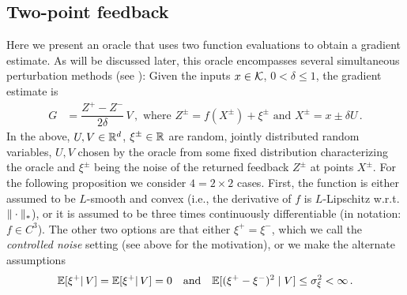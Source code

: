 \subsection{Two-point feedback}
Here we present an oracle that uses two function evaluations to obtain a gradient estimate.
As will be discussed later, this oracle
 encompasses several simultaneous perturbation methods (see \cite{bhatnagar-book}):
Given the inputs $x\in \mathcal{K}$,  $0<\delta\le 1$,
the gradient estimate is
\begin{align}
G &=  \dfrac{Z^+ - Z^-}{2\delta}\, V \,, \text{ where }  Z^{\pm} = f(X^{\pm}) + \xi^{\pm} \text{ and } X^{\pm} = x \pm \delta U\,.
 \label{eq:twosp}
\end{align}
In the above, $U,V\in \mathbb{R}^d$, $\xi^{\pm}\in \mathbb{R}$ are random, jointly distributed random variables, $U,V$ chosen by the oracle
from some fixed distribution characterizing the oracle and $\xi^{\pm}$ being the noise of the returned feedback $Z^{\pm}$ at points $X^{\pm}$.
For the following proposition we consider $4=2\times 2$ cases.
First, the function is either assumed to be $L$-smooth and convex (i.e., the derivative of $f$ is $L$-Lipschitz w.r.t. $\|\cdot\|_*$), or it is assumed to be three times continuously differentiable (in notation: $f\in C^3$).
The other two options are that either $\xi^+=\xi^-$, which we call the \emph{controlled noise} setting (see above for the motivation), or we make the alternate assumptions
\begin{align}
\mathbb{E}[\xi^+ |\, V] = \mathbb{E}[\xi^+ |\, V] =0 \text{~~ and ~~}\mathbb{E} [ (\xi^{+} - \xi^-)^{2} \mid V] \le \sigma_\xi^2 <\infty\,.
\label{eq:noiseass}
\end{align}

